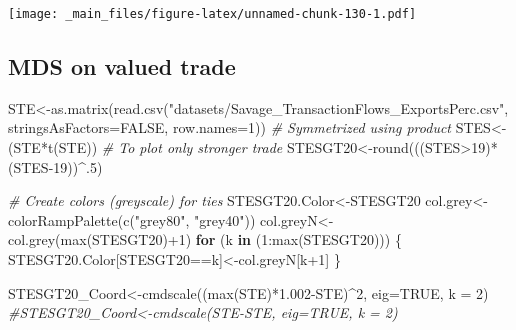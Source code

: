 \documentclass[
  notitlepage,
  onecolumn,
  openany]{book}
\newenvironment{Shaded}{\begin{snugshade}}{\end{snugshade}}
\newcommand{\AttributeTok}[1]{\textcolor[rgb]{0.77,0.63,0.00}{#1}}
\newcommand{\CommentTok}[1]{\textcolor[rgb]{0.56,0.35,0.01}{\textit{#1}}}
\newcommand{\ConstantTok}[1]{\textcolor[rgb]{0.00,0.00,0.00}{#1}}
\newcommand{\ControlFlowTok}[1]{\textcolor[rgb]{0.13,0.29,0.53}{\textbf{#1}}}
\newcommand{\DecValTok}[1]{\textcolor[rgb]{0.00,0.00,0.81}{#1}}
\newcommand{\FloatTok}[1]{\textcolor[rgb]{0.00,0.00,0.81}{#1}}
\newcommand{\FunctionTok}[1]{\textcolor[rgb]{0.00,0.00,0.00}{#1}}
\newcommand{\NormalTok}[1]{#1}
\newcommand{\OtherTok}[1]{\textcolor[rgb]{0.56,0.35,0.01}{#1}}
\newcommand{\SpecialCharTok}[1]{\textcolor[rgb]{0.00,0.00,0.00}{#1}}
\newcommand{\StringTok}[1]{\textcolor[rgb]{0.31,0.60,0.02}{#1}}
\begin{document}
\texttt{[image: \_main\_files/figure-latex/unnamed-chunk-130-1.pdf]}

\hypertarget{mds-on-valued-trade}{%
\subsection{MDS on valued trade}\label{mds-on-valued-trade}}

\begin{Shaded}
\begin{Highlighting}[]
\NormalTok{STE}\OtherTok{\textless{}{-}}\FunctionTok{as.matrix}\NormalTok{(}\FunctionTok{read.csv}\NormalTok{(}\StringTok{"datasets/Savage\_TransactionFlows\_ExportsPerc.csv"}\NormalTok{,}
                        \AttributeTok{stringsAsFactors=}\ConstantTok{FALSE}\NormalTok{, }\AttributeTok{row.names=}\DecValTok{1}\NormalTok{))}
\CommentTok{\# Symmetrized using product}
\NormalTok{STES}\OtherTok{\textless{}{-}}\NormalTok{(STE}\SpecialCharTok{*}\FunctionTok{t}\NormalTok{(STE))}
\CommentTok{\# To plot only stronger trade }
\NormalTok{STESGT20}\OtherTok{\textless{}{-}}\FunctionTok{round}\NormalTok{(((STES}\SpecialCharTok{\textgreater{}}\DecValTok{19}\NormalTok{)}\SpecialCharTok{*}\NormalTok{(STES}\DecValTok{{-}19}\NormalTok{))}\SpecialCharTok{\^{}}\NormalTok{.}\DecValTok{5}\NormalTok{)}

\CommentTok{\# Create colors (greyscale) for ties}
\NormalTok{STESGT20.Color}\OtherTok{\textless{}{-}}\NormalTok{STESGT20}
\NormalTok{col.grey}\OtherTok{\textless{}{-}}\FunctionTok{colorRampPalette}\NormalTok{(}\FunctionTok{c}\NormalTok{(}\StringTok{"grey80"}\NormalTok{, }\StringTok{"grey40"}\NormalTok{))}
\NormalTok{col.greyN}\OtherTok{\textless{}{-}}\FunctionTok{col.grey}\NormalTok{(}\FunctionTok{max}\NormalTok{(STESGT20)}\SpecialCharTok{+}\DecValTok{1}\NormalTok{)}
\ControlFlowTok{for}\NormalTok{ (k }\ControlFlowTok{in}\NormalTok{ (}\DecValTok{1}\SpecialCharTok{:}\FunctionTok{max}\NormalTok{(STESGT20)))}
\NormalTok{\{}
\NormalTok{    STESGT20.Color[STESGT20}\SpecialCharTok{==}\NormalTok{k]}\OtherTok{\textless{}{-}}\NormalTok{col.greyN[k}\SpecialCharTok{+}\DecValTok{1}\NormalTok{]}
\NormalTok{\}}

\NormalTok{STESGT20\_Coord}\OtherTok{\textless{}{-}}\FunctionTok{cmdscale}\NormalTok{((}\FunctionTok{max}\NormalTok{(STE)}\SpecialCharTok{*}\FloatTok{1.002}\SpecialCharTok{{-}}\NormalTok{STE)}\SpecialCharTok{\^{}}\DecValTok{2}\NormalTok{, }\AttributeTok{eig=}\ConstantTok{TRUE}\NormalTok{, }\AttributeTok{k =} \DecValTok{2}\NormalTok{)}
\CommentTok{\#STESGT20\_Coord\textless{}{-}cmdscale(STE{-}STE, eig=TRUE, k = 2)}


\end{Highlighting}
\end{Shaded}
\end{document}
